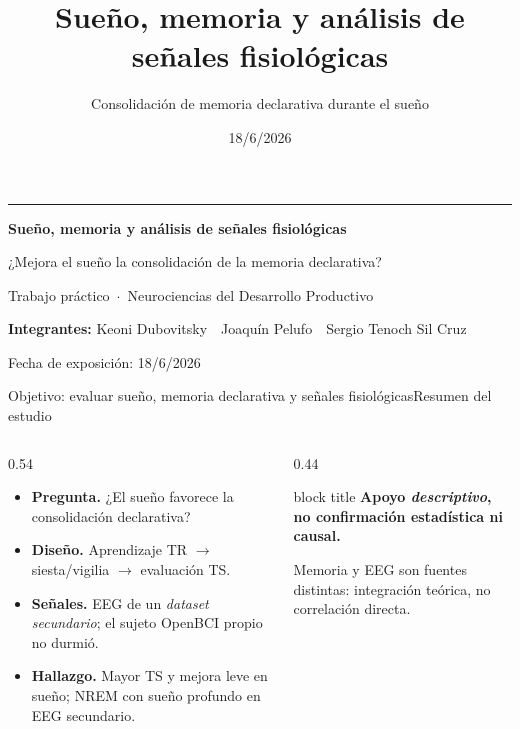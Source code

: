\documentclass[aspectratio=169,11pt,t]{beamer}
\title{Sueño, memoria y análisis de señales fisiológicas}
\subtitle{Consolidación de memoria declarativa durante el sueño}
\date{18/6/2026}
\newcommand{\claim}[1]{%
  \begin{beamercolorbox}[wd=\textwidth,sep=7pt,rounded=true,shadow=false]{block title}%
    \centering\bfseries #1%
  \end{beamercolorbox}}
\begin{document}
{
\begin{frame}[plain]
  \vfill
  \begin{beamercolorbox}[wd=\paperwidth,sep=16pt,leftskip=1.1cm,rightskip=1.1cm]{}
    {\color{amber}\rule{3.2cm}{2pt}}\par\vskip10pt
    {\color{navy}\bfseries\Large Sueño, memoria y análisis de señales fisiológicas}\par
    \vskip6pt
    {\color{ink}\large ¿Mejora el sueño la consolidación de la memoria declarativa?}\par
    \vskip18pt
    {\color{muted}\normalsize Trabajo práctico \,$\cdot$\, Neurociencias del Desarrollo Productivo}\par
  \end{beamercolorbox}
  \vfill
  \begin{beamercolorbox}[wd=\paperwidth,leftskip=1.1cm,rightskip=1.1cm]{}
    {\color{ink}\normalsize\textbf{Integrantes:} Keoni Dubovitsky \,\textbullet\, Joaquín Pelufo \,\textbullet\, Sergio Tenoch Sil Cruz}\par
    \vskip4pt
    {\color{muted}\small Fecha de exposición: 18/6/2026}\par
  \end{beamercolorbox}
  \vskip12pt
\end{frame}}

\begin{frame}{Objetivo: evaluar sueño, memoria declarativa y señales fisiológicas}{Resumen del estudio}
  \begin{columns}[T,onlytextwidth]
    \begin{column}{0.54\textwidth}
      \begin{itemize}\setlength\itemsep{3pt}
        \item \textbf{Pregunta.} ¿El sueño favorece la consolidación declarativa?
        \item \textbf{Diseño.} Aprendizaje TR $\to$ siesta/vigilia $\to$ evaluación TS.
        \item \textbf{Señales.} EEG de un \emph{dataset secundario}; el sujeto OpenBCI propio no durmió.
        \item \textbf{Hallazgo.} Mayor TS y mejora leve en sueño; NREM con sueño profundo en EEG secundario.
      \end{itemize}
    \end{column}
    \begin{column}{0.44\textwidth}
      \claim{Apoyo \emph{descriptivo}, no confirmación estadística ni causal.}
      \vskip4pt
      {\footnotesize\color{muted} Memoria y EEG son fuentes distintas: integración teórica, no correlación directa.}
    \end{column}
  \end{columns}
\end{frame}
\end{document}
